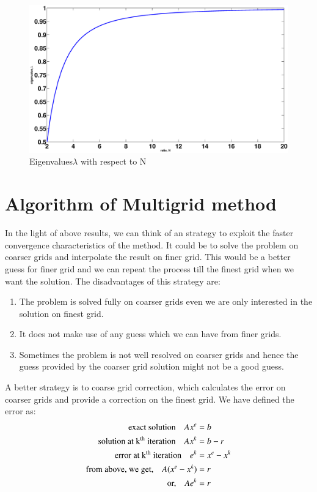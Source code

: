 \begin{figure}
 \centering
 \includegraphics[scale=0.2]{eigen_vs_N.eps}
 \caption{Eigenvalues$\lambda$ with respect to N}
 \label{Fig:eig_vs_N}
\end{figure}


\section{Algorithm of Multigrid method}

In the light of above results, we can think of an strategy to exploit the faster convergence characteristics of the method. It could be to solve the problem on 
coarser grids and interpolate the result on finer grid. This would be a better guess for finer grid and we can repeat the process till the finest grid when we 
want the solution. 
The disadvantages of this strategy are:
\begin{enumerate}
 \item The problem is solved fully on coarser grids even we are only interested in the solution on finest grid.
 \item It does not make use of any guess which we can have from finer grids.
 \item Sometimes the problem is not well resolved on coarser grids and hence the guess provided by the coarser grid solution might not be a good guess.
\end{enumerate}

A better strategy is to coarse grid correction, which calculates the error on coarser grids and provide a correction on the finest grid. We have defined the 
error as:
\begin{equation}
 \begin{align}
  \text{exact solution} \quad Ax^e &= b \\
  \text{solution at k\textsuperscript{th} iteration} \quad Ax^k &= b -r \\
  \text{error at k\textsuperscript{th} iteration} \quad e^k &= x^e - x^k \\
  \text{from above, we get,}\quad A(x^e-x^k) &= r \\
  \text{or,} \quad  Ae^k &= r
 \end{align}
 \label{E7}
\end{equation}

